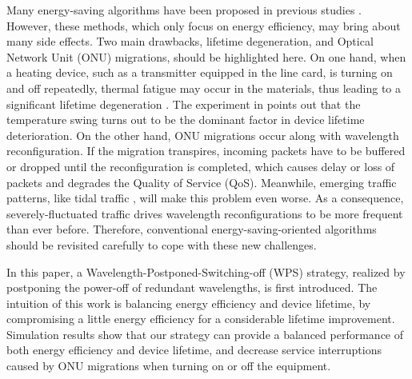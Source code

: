 \documentclass[letter]{IEEEtran}
\begin{document}
Many energy-saving algorithms have been proposed in previous studies \cite{6069715,6320604,7249119}. However, these methods, which only focus on energy efficiency, may bring about many side effects. Two main drawbacks, lifetime degeneration, and Optical Network Unit (ONU) migrations, should be highlighted here. On one hand, when a heating device, such as a transmitter equipped in the line card, is turning on and off repeatedly, thermal fatigue may occur in the materials, thus leading to a significant lifetime degeneration \cite{kressel2006semiconductor}. The experiment in \cite{schulz2012thermal} points out that the temperature swing turns out to be the dominant factor in device lifetime deterioration. On the other hand, ONU migrations occur along with wavelength reconfiguration. If the migration transpires, incoming packets have to be buffered or dropped until the reconfiguration is completed, which causes delay or loss of packets and degrades the Quality of Service (QoS). Meanwhile, emerging traffic patterns, like tidal traffic \cite{7444562}, will make this problem even worse.  As a consequence, severely-fluctuated traffic drives wavelength reconfigurations to be more frequent than ever before. Therefore, conventional energy-saving-oriented algorithms should be revisited carefully to cope with these new challenges.

In this paper, a Wavelength-Postponed-Switching-off (WPS) strategy, realized by postponing the power-off of redundant wavelengths, is first introduced. The intuition of this work is balancing energy efficiency and device lifetime, by compromising a little energy efficiency for a considerable lifetime improvement. Simulation results show that our strategy can provide a balanced performance of both energy efficiency and device lifetime, and decrease service interruptions caused by ONU migrations when turning on or off the equipment.


 



\end{document}
